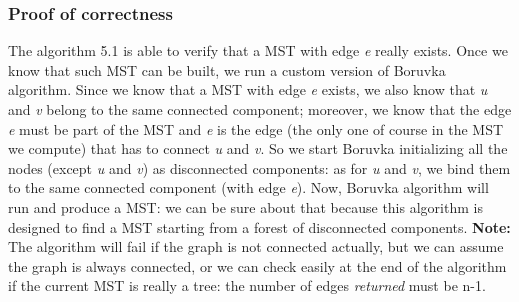 \documentclass[12pt]{article}
\begin{document}
\subsubsection{Proof of correctness}
The algorithm 5.1 is able to verify that a MST with edge \textit{e} really exists. Once we know that such MST can be built, we run a custom version of Boruvka algorithm. Since we know that a MST with edge \textit{e} exists, we also know that \textit{u} and \textit{v} belong to the same connected component; moreover, we know that the edge \textit{e} must be part of the MST and \textit{e} is the edge (the only one of course in the MST we compute) that has to connect \textit{u} and \textit{v}. So we start Boruvka initializing all the nodes (except \textit{u} and \textit{v}) as disconnected components: as for \textit{u} and \textit{v}, we bind them to the same connected component (with edge \textit{e}). Now, Boruvka algorithm will run and produce a MST: we can be sure about that because this algorithm is designed to find a MST starting from a forest of disconnected components. \textbf{Note:} The algorithm will fail if the graph is not connected actually, but we can assume the graph is always connected, or we can check easily at the end of the algorithm if the current MST is really a tree: the number of edges \textit{returned} must be n-1. 
\end{document}
